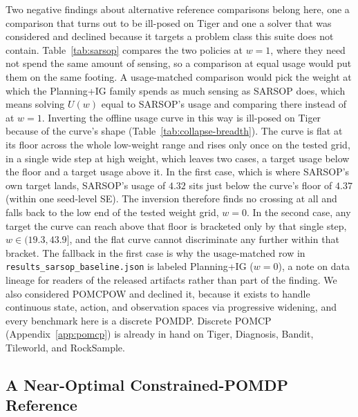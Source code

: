 Two negative findings about alternative reference comparisons belong here, one a comparison that turns out to be ill-posed on Tiger and one a solver that was considered and declined because it targets a problem class this suite does not contain. Table~\ref{tab:sarsop} compares the two policies at $w{=}1$, where they need not spend the same amount of sensing, so a comparison at equal usage would put them on the same footing. A usage-matched comparison would pick the weight at which the Planning+IG family spends as much sensing as SARSOP does, which means solving $U(w)$ equal to SARSOP's usage and comparing there instead of at $w{=}1$. Inverting the offline usage curve in this way is ill-posed on Tiger because of the curve's shape (Table~\ref{tab:collapse-breadth}). The curve is flat at its floor across the whole low-weight range and rises only once on the tested grid, in a single wide step at high weight, which leaves two cases, a target usage below the floor and a target usage above it. In the first case, which is where SARSOP's own target lands, SARSOP's usage of $4.32$ sits just below the curve's floor of $4.37$ (within one seed-level SE). The inversion therefore finds no crossing at all and falls back to the low end of the tested weight grid, $w{=}0$. In the second case, any target the curve can reach above that floor is bracketed only by that single step, $w \in (19.3, 43.9]$, and the flat curve cannot discriminate any further within that bracket. The fallback in the first case is why the usage-matched row in \texttt{results\_\allowbreak sarsop\_\allowbreak baseline.json} is labeled Planning+IG ($w{=}0$), a note on data lineage for readers of the released artifacts rather than part of the finding. We also considered POMCPOW \citep{sunberg2018} and declined it, because it exists to handle continuous state, action, and observation spaces via progressive widening, and every benchmark here is a discrete POMDP. Discrete POMCP (Appendix~\ref{app:pomcp}) is already in hand on Tiger, Diagnosis, Bandit, Tileworld, and RockSample.

\subsection{A Near-Optimal Constrained-POMDP Reference}
\label{app:cpomdp_details}

